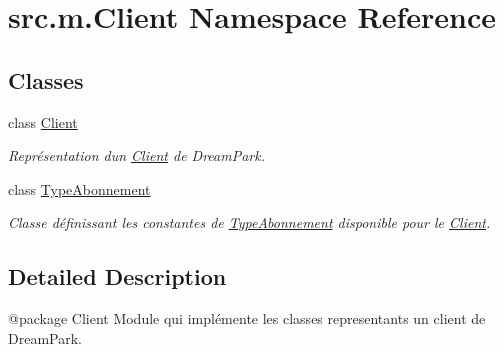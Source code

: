\hypertarget{namespacesrc_1_1m_1_1_client}{}\section{src.\+m.\+Client Namespace Reference}
\label{namespacesrc_1_1m_1_1_client}
\subsection*{Classes}
\begin{DoxyCompactItemize}
\item 
class \hyperlink{classsrc_1_1m_1_1_client_1_1_client}{Client}
\begin{DoxyCompactList}\small\item\em Représentation d\textquotesingle{}un \hyperlink{classsrc_1_1m_1_1_client_1_1_client}{Client} de Dream\+Park. \end{DoxyCompactList}\item 
class \hyperlink{classsrc_1_1m_1_1_client_1_1_type_abonnement}{Type\+Abonnement}
\begin{DoxyCompactList}\small\item\em Classe définissant les constantes de \hyperlink{classsrc_1_1m_1_1_client_1_1_type_abonnement}{Type\+Abonnement} disponible pour le \hyperlink{classsrc_1_1m_1_1_client_1_1_client}{Client}. \end{DoxyCompactList}\end{DoxyCompactItemize}


\subsection{Detailed Description}
\begin{DoxyVerb}@package Client
Module qui implémente les classes representants un client de DreamPark.
\end{DoxyVerb}
 